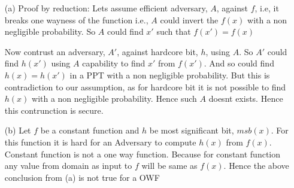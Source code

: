 \begin{itemize}
    \item [(a)] Proof by reduction:
Lets assume efficient adversary, $A$, against $f$, i.e, it breaks one wayness of
the function i.e., $A$ could invert the $f(x)$ with a non negligible probability.
So $A$ could find $x'$ such that $f(x') = f(x)$


Now contrust an adversary, $A'$, against hardcore bit, $h$, using $A$. So $A'$
could find $h(x')$ using $A$ capability to find $x'$ from $f(x')$. And so could find $h(x)= h(x')$ 
in a PPT with a non negligible probability. But this is contradiction to our assumption,
as for hardcore bit it is not possible to find $h(x)$ with a 
non negligible probability. Hence such $A$ doesnt exists. Hence this contrunction is secure.

    \item [(b)] Let $f$ be a constant function and $h$ be most significant bit, $msb(x)$.
  For this function it is hard for an Adversary to compute $h(x)$ from $f(x)$.
  Constant function is not a one way function. Because for constant function any value from domain
  as input to $f$ will be same as $f(x)$. Hence the above conclusion from (a) is not true 
  for a OWF
\end{itemize}